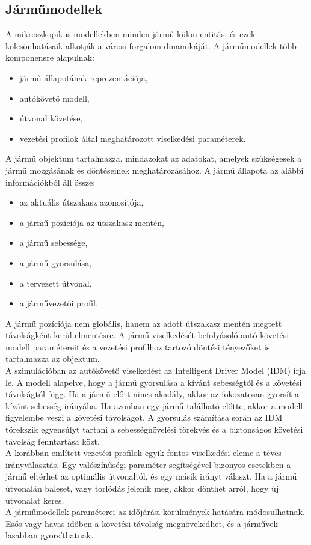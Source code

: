 \documentclass[14pt,a4paper]{extarticle}
\begin{document}
\subsection{Járműmodellek}
A mikroszkopikus modellekben minden jármű külön entitás, és ezek kölcsönhatásaik alkotják a városi forgalom dinamikáját. A járműmodellek több komponensre alapulnak:
\begin{itemize}
    \item jármű állapotának reprezentációja,
    \item autókövető modell,
    \item útvonal követése,
    \item vezetési profilok által meghatározott viselkedési paraméterek.
\end{itemize}
A jármű objektum tartalmazza, mindazokat az adatokat, amelyek szükségesek a jármű mozgásának és döntéseinek meghatározásához. A jármű állapota az alábbi információkból áll össze:
\begin{itemize}
    \item az aktuális útszakasz azonosítója,
    \item a jármű pozíciója az útszakasz mentén,
    \item a jármű sebessége,
    \item a jármű gyorsulása,
    \item a tervezett útvonal,
    \item a járművezetői profil.
\end{itemize}
A jármű pozíciója nem globális, hanem az adott útszakasz mentén megtett távolságként kerül elmentésre. A jármű viselkedését befolyásoló autó követési modell paramétereit és a vezetési profilhoz tartozó döntési tényezőket is tartalmazza az objektum.
\\
A szimulációban az autókövető viselkedést az Intelligent Driver Model (IDM) írja le. A modell alapelve, hogy a jármű gyorsulása a kívánt sebességtől és a követési távolságtól függ. Ha a jármű előtt nincs akadály, akkor az fokozatosan gyorsít a kívánt sebesség irányába. Ha azonban egy jármű található előtte, akkor a modell figyelembe veszi a követési távolságot. A gyorsulás számítása során az IDM törekszik egyensúlyt tartani a sebességnövelési törekvés és a biztonságos követési távolság fenntartása közt.
\\
A korábban említett vezetési profilok egyik fontos viselkedési eleme a téves irányválasztás. Egy valószínűségi paraméter segítségével bizonyos esetekben a jármű eltérhet az optimális útvonaltól, és egy másik irányt választ. Ha a jármű útvonalán baleset, vagy torlódás jelenik meg, akkor dönthet arról, hogy új útvonalat keres.
\\
A járműmodellek paraméterei az időjárási körülmények hatására módosulhatnak. Esős vagy havas időben a követési távolság megnövekedhet, és a járművek lasabban gyorsíthatnak.
\end{document}
